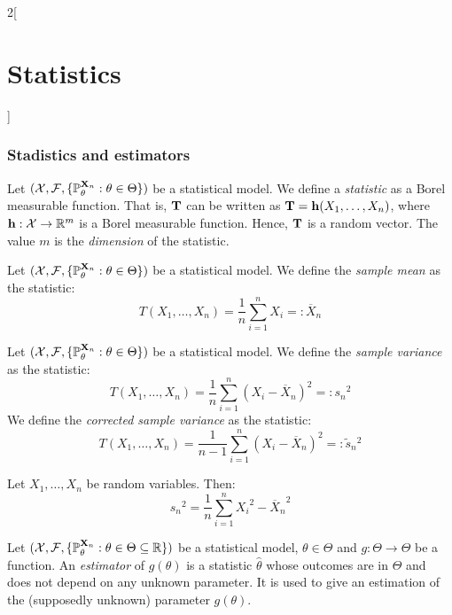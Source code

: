 \documentclass[../../../main.tex]{subfiles}
\begin{document}
\begin{multicols}{2}[\section{Statistics}]
  \subsubsection{Stadistics and estimators}
  \begin{definition}[Statistic]
    Let $(\mathcal{X},\mathcal{F},\{\mathbb{P}_\theta^{\boldsymbol{\mathrm{X}}_n}:\theta\in\Theta\})$ be a statistical model. We define a \emph{statistic} as a Borel measurable function. That is, $\boldsymbol{\mathrm{T}}$ can be written as $\boldsymbol{\mathrm{T}}=\boldsymbol{\mathrm{h}}(X_1,\ldots,X_n)$, where $\boldsymbol{\mathrm{h}}:\mathcal{X}\rightarrow\mathbb{R}^m$ is a Borel measurable function. Hence, $\boldsymbol{\mathrm{T}}$ is a random vector. The value $m$ is the \emph{dimension} of the statistic.
  \end{definition}
  \begin{definition}
    Let $(\mathcal{X},\mathcal{F},\{\mathbb{P}_\theta^{\boldsymbol{\mathrm{X}}_n}:\theta\in\Theta\})$ be a statistical model. We define the \emph{sample mean} as the statistic: $$T(X_1,\ldots,X_n)=\frac{1}{n}\sum_{i=1}^nX_i=:\overline{X}_n$$
  \end{definition}
  \begin{definition}
    Let $(\mathcal{X},\mathcal{F},\{\mathbb{P}_\theta^{\boldsymbol{\mathrm{X}}_n}:\theta\in\Theta\})$ be a statistical model. We define the \emph{sample variance} as the statistic: $$T(X_1,\ldots,X_n)=\frac{1}{n}\sum_{i=1}^n{(X_i-\overline{X}_n)}^2=:{s_n}^2$$ We define the \emph{corrected sample variance} as the statistic:
    $$T(X_1,\ldots,X_n)=\frac{1}{n-1}\sum_{i=1}^n{(X_i-\overline{X}_n)}^2=:\tilde{s}_n{}^2$$
  \end{definition}
  \begin{proposition}
    Let $X_1,\ldots,X_n$ be random variables. Then: $${s_n}^2=\frac{1}{n}\sum_{i=1}^n{X_i}^2-{\overline{X}_n}^2$$
  \end{proposition}
  \begin{definition}
    Let $(\mathcal{X},\mathcal{F},\{\mathbb{P}_{\theta}^{\boldsymbol{\mathrm{X}}_n}:{\theta}\in\Theta\subseteq \mathbb{R}\})$ be a statistical model, ${\theta} \in\Theta$ and $g:\Theta\rightarrow\Theta$ be a function. An \emph{estimator} of $g({\theta})$ is a statistic ${\hat\theta}$ whose outcomes are in $\Theta$ and does not depend on any unknown parameter. It is used to give an estimation of the (supposedly unknown) parameter $g({\theta})$.
  \end{definition}

\end{multicols}
\end{document}
